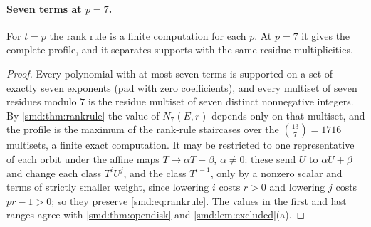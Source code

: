 \paragraph{Seven terms at $p=7$.}
For $t=p$ the rank rule is a finite computation for each $p$. At $p=7$ it gives the
complete profile, and it separates supports with the same residue multiplicities.


\begin{proof}
Every polynomial with at most seven terms is supported on a set of exactly seven exponents
(pad with zero coefficients), and every multiset of seven residues modulo $7$ is the
residue multiset of seven distinct nonnegative integers. By \cref{smd:thm:rankrule} the
value of $N_7(E,r)$ depends only on that multiset, and the profile is the maximum of the
rank-rule staircases over the $\binom{13}7=1716$ multisets, a finite exact computation.
It may be restricted to one representative of each orbit under the affine maps
$T\mapsto\alpha T+\beta$, $\alpha\ne0$: these send $U$ to $\alpha U+\beta$ and change each
class $T^iU^j$, and the class $T^{t-1}$, only by a nonzero scalar and terms of strictly
smaller weight, since lowering $i$ costs $r>0$ and lowering $j$ costs $pr-1>0$; so they
preserve \eqref{smd:eq:rankrule}. The values in the first and last ranges agree with
\cref{smd:thm:opendisk} and \cref{smd:lem:excluded}(a).
\end{proof}

